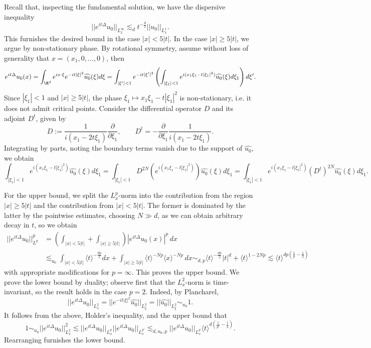 \begin{solution}
	Recall that, inspecting the fundamental solution, we have the dispersive inequality
		\[ ||e^{it \Delta} u_0 ||_{L^\infty_x} \lesssim_d t^{-\frac{d}{2}} ||u_0||_{L^1_x}. \]
	This furnishes the desired bound in the case $|x| < 5|t|$. In the case $|x| \geq 5|t|$, we argue by non-stationary phase. By rotational symmetry, assume without loss of generality that $x = (x_1, 0, \dots, 0)$, then 
		\[ e^{it \Delta} u_0 (x) = \int_{\R^d} e^{i x \cdot \xi} e^{-i t |\xi|^2} \widehat{u_0} (\xi) d \xi = \int_{|\xi'| < 1} e^{- i t |\xi'|^2}\left(\int_{|\xi_1| < 1} e^{i(x_1 \xi_1 - t |\xi_1|^2)} \widehat{u_0} (\xi) d\xi_1 \right) d\xi'. \]
	Since $|\xi_1| < 1$ and $|x| \geq 5|t|$, the phase $\xi_1 \mapsto x_1 \xi_1 - t |\xi_1|^2$ is non-stationary, i.e. it does not admit critical points. 	Consider the differential operator $D$ and its adjoint $D^t$, given by 
		\[ D := \frac{1}{i(x_1 - 2 t \xi_1)} \frac{\partial}{\partial\xi_1}, \qquad D^t =- \frac{\partial}{\partial \xi_1} \frac{1}{i (x_1 - 2t \xi_1)}. \]
	 Integrating by parts, noting the boundary terms vanish due to the support of $\widehat{u_0}$, we obtain 
		\[ \int_{|\xi_1| < 1} e^{i(x_1 \xi_1 - t |\xi_1|^2)} \widehat{u_0} (\xi) d\xi_1 = \int_{|\xi_1| < 1} D^{2N} (e^{i(x_1 \xi_1 - t |\xi_1|^2)}) \widehat{u_0} (\xi) d\xi_1= \int_{|\xi_1| < 1} e^{i (x_1 \xi_1 - t |\xi_1|^2)} (D^t)^{2N} \widehat{u_0} (\xi) d \xi_1. \]

	For the upper bound, we split the $L^p_x$-norm into the contribution from the region $|x| \geq 5|t|$ and the contribution from $|x| < 5|t|$. The former is dominated by the latter by the pointwise estimates, choosing $N \gg d$, as we can obtain arbitrary decay in $t$, so we obtain
		\begin{align*}
			||e^{it \Delta} u_0 ||_{L^p}^p 
				&= \left( \int_{|x| < 5|t|} + \int_{|x| \geq 5|t|} \right) |e^{it \Delta} u_0 (x)|^p \, dx\\
				&\lesssim_{u_0} \int_{|x| < 5|t|} \langle t \rangle^{-\frac{dp}{2}} dx + \int_{|x| \geq 5|t|}  \langle t \rangle^{-Np}\langle x \rangle^{-Np} \, dx \sim_{d, p} \langle t \rangle^{-\frac{dp}{2}} |t|^d + \langle t \rangle^{1 - 2Np}  \lesssim \langle t \rangle^{dp (\frac1p - \frac12)} 
		\end{align*}			
	with appropriate modifications for $p = \infty$. This proves the upper bound. We prove the lower bound by duality; observe first that the $L^2_x$-norm is time-invariant, so the result holds in the case $p = 2$. Indeed, by Plancharel, 
		\[ ||e^{it \Delta} u_0||_{L^2_x} = ||e^{-it |\xi|^2} \widehat{u_0} ||_{L^2_\xi} = ||\widehat{u_0} ||_{L^2_\xi} \sim_{u_0} 1. \]
	It follows from the above, Holder's inequality, and the upper bound that
		\[ 1 \sim_{u_0} ||e^{it \Delta} u_0||_{L^2_x}^2 \lesssim ||e^{it \Delta} u_0||_{L^p_x}||e^{it \Delta} u_0||_{L^{p'}_x} \lesssim_{d, u_0, p} ||e^{it \Delta} u_0||_{L^p_x} \langle t \rangle^{d (\frac{1}{p'} - \frac12)}. \]
	Rearranging furnishes the lower bound. 		
\end{solution}

